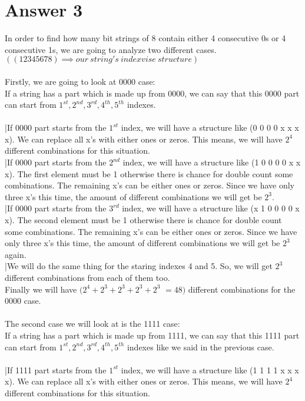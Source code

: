 \documentclass[12pt]{article}
\begin{document}
\section*{Answer 3}
In order to find how many bit strings of 8 contain either 4 consecutive 0s or 4 consecutive 1s, we are going to analyze two different cases. $((1 2 3 4 5 6 7 8) \implies our \ string's \ indexvise \ structure)$\\
\\
Firstly, we are going to look at 0000 case:\\
If a string has a part which is made up from 0000, we can say that this 0000 part can  start from $1^{st},2^{nd},3^{rd},4^{th},5^{th}$ indexes.\\
\\
|If 0000 part starts from the $1^{st}$ index, we will have a structure like (0 0 0 0 x x x x). We can replace all x's with either ones or zeros. This means, we will have $2^4$ different combinations for this situation.\\
|If 0000 part starts from the $2^{nd}$ index, we will have a structure like (1 0 0 0 0 x x x). The first element must be 1 otherwise there is chance for double count some combinations. The remaining x's can be  either ones or zeros. Since we have only three x's this time, the amount of different combinations we will get be $2^3$.\\
|If 0000 part starts from the $3^{rd}$ index, we will have a structure like (x 1 0 0 0 0 x x). The second element must be 1 otherwise there is chance for double count some combinations. The remaining x's can be  either ones or zeros. Since we have only three x's this time, the amount of different combinations we will get be $2^3$ again.\\
|We will do the same thing for the staring indexes 4 and 5. So, we will get $2^3$ different combinations from each of them too.\\
Finally we will have $(2^4 + 2^3 + 2^3 + 2^3 + 2^3$ $= 48)$ different combinations for the 0000 case.\\
\\
The second case we will look at is the 1111 case:\\
If a string has a part which is made up from 1111, we can say that this 1111 part can  start from $1^{st},2^{nd},3^{rd},4^{th},5^{th}$ indexes like we said in the previous case.\\
\\
|If 1111 part starts from the $1^{st}$ index, we will have a structure like (1 1 1 1 x x x x). We can replace all x's with either ones or zeros. This means, we will have $2^4$ different combinations for this situation.\\
\end{document}
